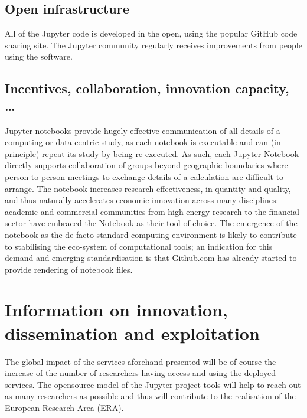 \subsection{Open infrastructure}

All of the Jupyter code is developed in the open, using the popular GitHub
code sharing site. The Jupyter community regularly receives improvements from
people using the software.

\subsection{Incentives, collaboration, innovation capacity, \ldots}
Jupyter notebooks provide hugely effective communication of all
details of a computing or data centric study, as each notebook is
executable and can (in principle) repeat its study by being
re-executed. As such, each Jupyter Notebook directly supports
collaboration of groups beyond geographic boundaries where
person-to-person meetings to exchange details of a calculation are
difficult to arrange. The notebook increases research effectiveness,
in quantity and quality, and thus naturally accelerates economic
innovation across many disciplines: academic and commercial
communities from high-energy research to the financial sector have
embraced the Notebook as their tool of choice. The emergence of the
notebook as the de-facto standard computing environment is likely to
contribute to stabilising the eco-system of computational tools; an
indication for this demand and emerging standardisation is that
Github.com has already started to provide rendering of notebook files.




\section{Information on innovation, dissemination and exploitation}

The global impact of the services aforehand presented will be of course the
increase of the number of researchers having access and using the deployed
services. The opensource model of the Jupyter project tools will help to reach
out as many researchers as possible and thus will contribute to the realisation
of the European Research Area  (ERA).

